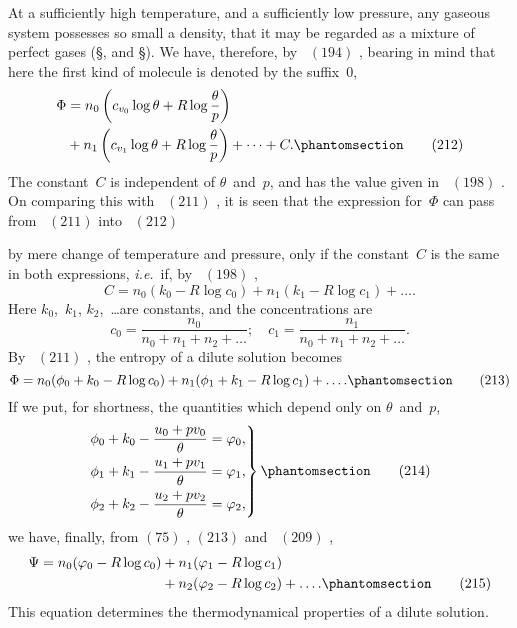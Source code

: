 \documentclass[12pt]{book}[2005/09/16]
\newcommand{\Chg}[2]{#2}
\newcommand{\Add}[1]{\Chg{}{#1}}
\newcommand{\SecRef}[2][§\;]{\hyperref[section:#2.]{{\upshape #1#2}}}
\newcommand{\Tag}[1]{%
  \phantomsection\label{eqn:#1}\tag*{\ensuremath{#1}}%
}
\newcommand{\Eq}[1]{%
  \hyperref[eqn:#1]{\ensuremath{#1}}%
}
\newcommand{\PageSep}[1]{\ignorespaces}
\newcommand{\ie}{\emph{i.e.}}
\begin{document}
At a sufficiently high temperature, and a sufficiently
low pressure, any gaseous system possesses so small a
density, that it may be regarded as a mixture of perfect
gases (\SecRef{21}, and \SecRef{43}). We have, therefore, by~\Eq{(194)}, bearing
in mind that here the first kind of molecule is denoted
by the suffix~$0$,
\begin{align*}
\Phi &= n_{0} \left(c_{v_{0}} \log \theta + R \log \frac{\theta}{p}\right) \\
     &+ n_{1} \left(c_{v_{1}} \log \theta + R \log \frac{\theta}{p}\right)
  + \dots + C.
\Tag{(212)}
\end{align*}
The constant~$C$ is independent of $\theta$~and~$p$, and has the
value given in~\Eq{(198)}. On comparing this with~\Eq{(211)}, it is
seen that the expression for~$\Phi$ can pass from~\Eq{(211)} into~\Eq{(212)}
by mere change of temperature and pressure, only if the
constant~$C$ is the same in both expressions, \ie\ if, by~\Eq{(198)},
\[
C = n_{0} (k_{0} - R \log c_{0}) + n_{1} (k_{1} - R \log c_{1}) + \dots\Add{.}
\]
Here $k_{0}$,~$k_{1}$, $k_{2}$,~\dots are constants, and the concentrations are
\[
c_{0} = \frac{n_{0}}{n_{0} + n_{1} + n_{2} + \dots};\quad
c_{1} = \frac{n_{1}}{n_{0} + n_{1} + n_{2} + \dots}.
\]
By~\Eq{(211)}, the entropy of a dilute solution becomes
\[
\Phi = n_{0} (\phi_{0} + k_{0} - R \log c_{0})
     + n_{1} (\phi_{1} + k_{1} - R \log c_{1}) + \dots\Add{.}
\Tag{(213)}
\]
If we put, for shortness, the quantities which depend only
on $\theta$~and~$p$,
\[
\left.
\begin{aligned}
\phi_{0} + k_{0} - \frac{u_{0} + pv_{0}}{\theta} &= \varphi_{0}\Add{,} \\
\phi_{1} + k_{1} - \frac{u_{1} + pv_{1}}{\theta} &= \varphi_{1}\Add{,} \\
\phi_{2} + k_{2} - \frac{u_{2} + pv_{2}}{\theta} &= \varphi_{2}\Add{,} \\
\end{aligned}
\right\}
\Tag{(214)}
\]
\PageSep{229}
we have, finally, from \Eq{(75)}, \Eq{(213)} and~\Eq{(209)},
\begin{align*}
\Psi = n_{0} (\varphi_{0} - R \log c_{0})
     &+ n_{1} (\varphi_{1} - R \log c_{1}) \\
     &+ n_{2} (\varphi_{2} - R \log c_{2})
      + \dots\Add{.}
\Tag{(215)}
\end{align*}
This equation determines the thermodynamical properties of
a dilute solution.
\end{document}
